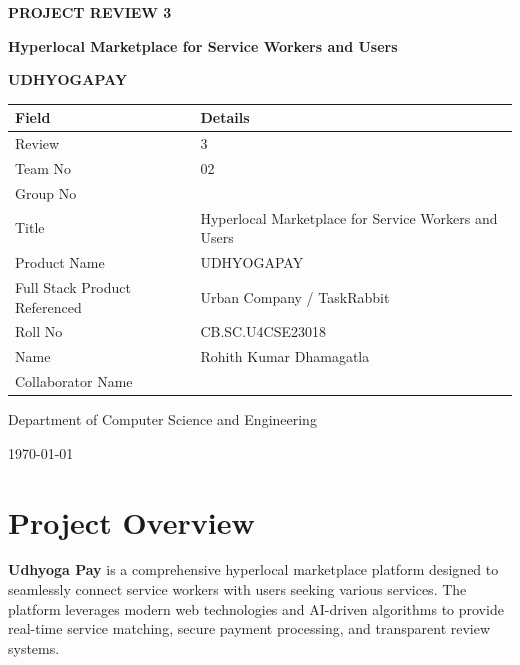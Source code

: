 \documentclass[12pt,a4paper]{article}
\begin{document}
\begin{titlepage}
    \centering
    \vspace*{2cm}
    
    {\Huge\bfseries PROJECT REVIEW 3\par}
    \vspace{1cm}
    {\LARGE\bfseries Hyperlocal Marketplace for Service Workers and Users\par}
    \vspace{0.5cm}
    {\Large\textbf{UDHYOGAPAY}\par}
    
    \vspace{2cm}
    
    \begin{tabular}{|p{5cm}|p{8cm}|}
    \hline
    \rowcolor{lightgray}
    \textbf{Field} & \textbf{Details} \\
    \hline
    Review & 3 \\
    \hline
    Team No & 02 \\
    \hline
    Group No & ~~ \\
    \hline
    Title & Hyperlocal Marketplace for Service Workers and Users \\
    \hline
    Product Name & UDHYOGAPAY \\
    \hline
    Full Stack Product Referenced & Urban Company / TaskRabbit \\
    \hline
    Roll No & CB.SC.U4CSE23018 \\
    \hline
    Name & Rohith Kumar Dhamagatla \\
    \hline
    Collaborator Name & ~~ \\
    \hline
    \end{tabular}
    
    \vfill
    
    {\large Department of Computer Science and Engineering\par}
    {\large \today\par}
\end{titlepage}

\newpage

\section*{Project Overview}

\textbf{Udhyoga Pay} is a comprehensive hyperlocal marketplace platform designed to seamlessly connect service workers with users seeking various services. The platform leverages modern web technologies and AI-driven algorithms to provide real-time service matching, secure payment processing, and transparent review systems.
\end{document}
